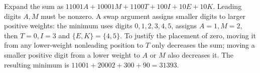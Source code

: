 Expand the sum as $11001A+10001M+1100T+100I+10E+10K$. Leading digits $A,M$ must be nonzero. A swap argument assigns smaller digits to larger positive weights: the minimum uses digits $0,1,2,3,4,5$, assigns $A=1,M=2$, then $T=0,I=3$ and $\{E,K\}=\{4,5\}$. To justify the placement of zero, moving it from any lower-weight nonleading position to $T$ only decreases the sum; moving a smaller positive digit from a lower weight to $A$ or $M$ also decreases it. The resulting minimum is $11001+20002+300+90=\boxed{31393}$.
